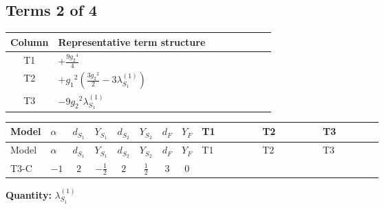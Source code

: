 \documentclass[8pt]{article}
\begin{document}
\begin{landscape}
\subsection*{Terms 2 of 4}
\begin{center}
\begin{tabular}{@{}c >{\raggedright\arraybackslash}p{0.82\linewidth}@{}}
\toprule
Column & Representative term structure \\
\midrule
T1 & \(\displaystyle +\frac{9 {g_2}^4}{4}\) \\
\midrule
T2 & \(\displaystyle +{g_1}^2 \left(\frac{3 {g_2}^2}{2}-3 {\lambda_{S_1}^{(1)}}\right)\) \\
\midrule
T3 & \(\displaystyle -9 {g_2}^2 {\lambda_{S_1}^{(1)}}\) \\
\midrule
\bottomrule
\end{tabular}
\end{center}
\smallskip
\tiny
\begin{longtable}{@{}llcccccc >{\raggedright\arraybackslash}p{0.21\linewidth} >{\raggedright\arraybackslash}p{0.21\linewidth} >{\raggedright\arraybackslash}p{0.21\linewidth}@{}}
\toprule
Model & $\alpha$ & $d_{S_1}$ & $Y_{S_1}$ & $d_{S_2}$ & $Y_{S_2}$ & $d_F$ & $Y_F$ & T1 & T2 & T3 \\
\midrule
\endfirsthead
\toprule
Model & $\alpha$ & $d_{S_1}$ & $Y_{S_1}$ & $d_{S_2}$ & $Y_{S_2}$ & $d_F$ & $Y_F$ & T1 & T2 & T3 \\
\midrule
\endhead
T3-C & $-1$ & $2$ & $-\frac{1}{2}$ & $2$ & $\frac{1}{2}$ & $3$ & $0$ & \scriptsize\adjustbox{max width=\linewidth}{$\begin{gathered} +\frac{9 {g_2}^4}{4}\end{gathered}$} & \scriptsize\adjustbox{max width=\linewidth}{$\begin{gathered} +{g_1}^2 \left(\frac{3 {g_2}^2}{2}-3 {\lambda_{S_1}^{(1)}}\right)\end{gathered}$} & \scriptsize\adjustbox{max width=\linewidth}{$\begin{gathered} -9 {g_2}^2 {\lambda_{S_1}^{(1)}}\end{gathered}$} \\
\midrule
\bottomrule
\end{longtable}
\clearpage
\noindent\textbf{Quantity: }$\lambda_{S_1}^{(1)}$\par\smallskip

\end{landscape}
\end{document}

